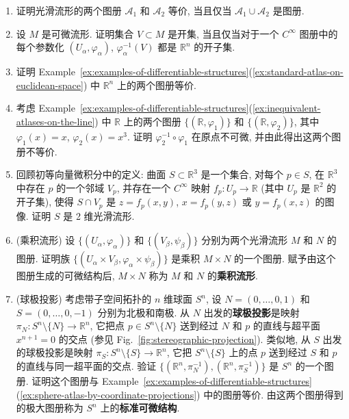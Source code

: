 \begin{RiemannExercise}\label{ex:exercise-differentiable-structures}
\begin{enumerate}[label=(\arabic*),ref=\arabic*,leftmargin=*]
\item\label{ex:compare-atlases-by-union} 证明光滑流形的两个图册 $\mathcal{A}_1$ 和 $\mathcal{A}_2$ 等价, 当且仅当 $\mathcal{A}_1\cup\mathcal{A}_2$ 是图册.
\item\label{ex:open-sets-in-parameterizations} 设 $M$ 是可微流形. 证明集合 $V\subset M$ 是开集, 当且仅当对于一个 $C^\infty$ 图册中的每个参数化 $(U_\alpha,\varphi_\alpha)$, $\varphi_\alpha^{-1}(V)$ 都是 $\mathbb{R}^n$ 的开子集.
\item\label{ex:euclidean-atlases-equivalent} 证明 Example~\ref{ex:examples-of-differentiable-structures}(\ref{ex:standard-atlas-on-euclidean-space}) 中 $\mathbb{R}^n$ 上的两个图册等价.
\item\label{ex:prove-inequivalence-of-line-atlases} 考虑 Example~\ref{ex:examples-of-differentiable-structures}(\ref{ex:inequivalent-atlases-on-the-line}) 中 $\mathbb{R}$ 上的两个图册 $\{(\mathbb{R},\varphi_1)\}$ 和 $\{(\mathbb{R},\varphi_2)\}$, 其中 $\varphi_1(x)=x$, $\varphi_2(x)=x^3$. 证明 $\varphi_2^{-1}\circ\varphi_1$ 在原点不可微, 并由此得出这两个图册不等价.
\item\label{ex:surfaces-as-local-graphs} 回顾初等向量微积分中的定义: 曲面 $S\subset\mathbb{R}^3$ 是一个集合, 对每个 $p\in S$, 在 $\mathbb{R}^3$ 中存在 $p$ 的一个邻域 $V_p$, 并存在一个 $C^\infty$ 映射 $f_p:U_p\to\mathbb{R}$ (其中 $U_p$ 是 $\mathbb{R}^2$ 的开子集), 使得 $S\cap V_p$ 是 $z=f_p(x,y)$, $x=f_p(y,z)$ 或 $y=f_p(x,z)$ 的图像. 证明 $S$ 是 2 维光滑流形.
\item\label{ex:product-differentiable-manifold} (乘积流形) 设 $\{(U_\alpha,\varphi_\alpha)\}$ 和 $\{(V_\beta,\psi_\beta)\}$ 分别为两个光滑流形 $M$ 和 $N$ 的图册. 证明族 $\{(U_\alpha\times V_\beta,\varphi_\alpha\times\psi_\beta)\}$ 是乘积 $M\times N$ 的一个图册. 赋予由这个图册生成的可微结构后, $M\times N$ 称为 $M$ 和 $N$ 的\textbf{乘积流形}.
\item\label{ex:stereographic-sphere-atlas} (球极投影) 考虑带子空间拓扑的 $n$ 维球面 $S^n$, 设 $N=(0,\ldots,0,1)$ 和 $S=(0,\ldots,0,-1)$ 分别为北极和南极. 从 $N$ 出发的\textbf{球极投影}是映射 $\pi_N:S^n\setminus\{N\}\to\mathbb{R}^n$, 它把点 $p\in S^n\setminus\{N\}$ 送到经过 $N$ 和 $p$ 的直线与超平面 $x^{n+1}=0$ 的交点 (参见 Fig.~\ref{fig:stereographic-projection}). 类似地, 从 $S$ 出发的球极投影是映射 $\pi_S:S^n\setminus\{S\}\to\mathbb{R}^n$, 它把 $S^n\setminus\{S\}$ 上的点 $p$ 送到经过 $S$ 和 $p$ 的直线与同一超平面的交点. 验证 $\{(\mathbb{R}^n,\pi_N^{-1}),(\mathbb{R}^n,\pi_S^{-1})\}$ 是 $S^n$ 的一个图册. 证明这个图册与 Example~\ref{ex:examples-of-differentiable-structures}(\ref{ex:sphere-atlas-by-coordinate-projections}) 中的图册等价. 由这两个图册得到的极大图册称为 $S^n$ 上的\textbf{标准可微结构}.

\end{enumerate}
\end{RiemannExercise}
